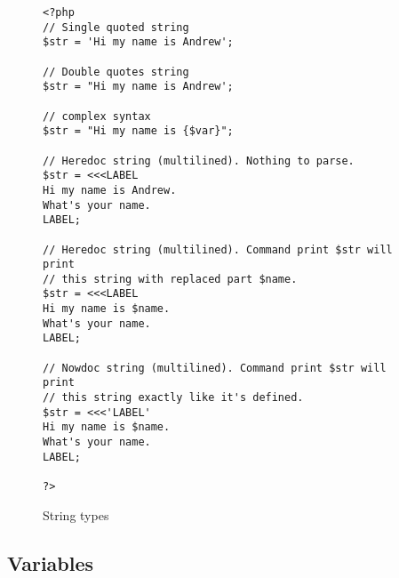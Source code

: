 \documentclass{article}
\begin{document}
\begin{figure}[h]
\lstset{language=PHP}
\begin{lstlisting}[showstringspaces=false]
<?php
// Single quoted string
$str = 'Hi my name is Andrew';

// Double quotes string
$str = "Hi my name is Andrew';

// complex syntax
$str = "Hi my name is {$var}";

// Heredoc string (multilined). Nothing to parse.
$str = <<<LABEL
Hi my name is Andrew.
What's your name.
LABEL;

// Heredoc string (multilined). Command print $str will print
// this string with replaced part $name.
$str = <<<LABEL
Hi my name is $name.
What's your name.
LABEL;

// Nowdoc string (multilined). Command print $str will print
// this string exactly like it's defined.
$str = <<<'LABEL'
Hi my name is $name.
What's your name.
LABEL;

?>
\end{lstlisting}
\caption{String types \label{strings}}
\end{figure}

\subsection{Variables}
\end{document}
